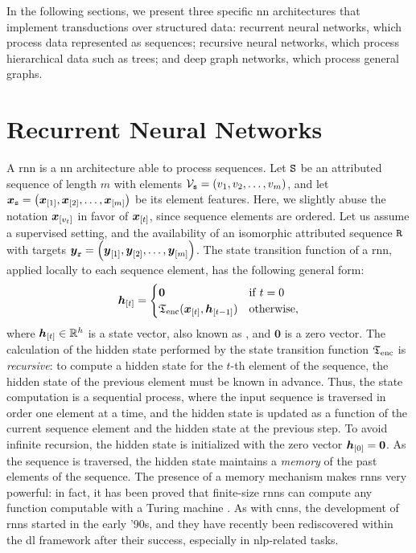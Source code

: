 In the following sections, we present three specific \gls{nn} architectures that implement transductions over structured data: recurrent neural networks, which process data represented as sequences; recursive neural networks, which process hierarchical data such as trees; and deep graph networks, which process general graphs.

\section{Recurrent Neural Networks}\label{sec:rnns}
A \gls{rnn} is a \gls{nn} architecture able to process sequences. Let $\AttrGraph{S}$ be an attributed sequence of length $m$ with elements $\Nodes{s} = (v_1, v_2, \ldots, v_m)$, and let $\GraphFeatures{x}{s} = \Par{\Elem{x}{1}, \Elem{x}{2}, \ldots, \Elem{x}{m}}$ be its element features. Here, we slightly abuse the notation $\Elem{x}{v_t}$ in favor of $\Elem{x}{t}$, since sequence elements are ordered. Let us assume a supervised setting, and the availability of an isomorphic attributed sequence $\AttrGraph{R}$ with targets $\GraphFeatures{y}{r} = \Par{\Elem{y}{1}, \Elem{y}{2}, \ldots, \Elem{y}{m}}$. The state transition function of a \gls{rnn}, applied locally to each sequence element, has the following general form:
\begin{align*}
    \Elem{h}{t} =
    \begin{cases}
        \boldsymbol{0} & \mathrm{if}\; t = 0\\
        \EncTrans(\Elem{x}{t}, \Elem{h}{t-1}) & \mathrm{otherwise},
    \end{cases}
\end{align*}
where $\Elem{h}{t} \in \Real^h$ is a state vector, also known as , and $\boldsymbol{0}$ is a zero vector. The calculation of the hidden state performed by the state transition function $\mathfrak{T}_{\mathrm{enc}}$ is \emph{recursive}: to compute a hidden state for the $t$-th element of the sequence, the hidden state of the previous element must be known in advance. Thus, the state computation is a sequential process, where the input sequence is traversed in order one element at a time, and the hidden state is updated as a function of the current sequence element and the hidden state at the previous step. To avoid infinite recursion, the hidden state is initialized with the zero vector $\Elem{h}{0} = \boldsymbol{0}$. As the sequence is traversed, the hidden state maintains a \emph{memory} of the past elements of the sequence. The presence of a memory mechanism makes \glspl{rnn} very powerful: in fact, it has been proved that finite-size \glspl{rnn} can compute any function computable with a Turing machine \citep{siegelmann1995rnnturing}. As with \glspl{cnn}, the development of \glspl{rnn} started in the early '90s, and they have recently been rediscovered within the \gls{dl} framework after their success, especially in \gls{nlp}-related tasks.


